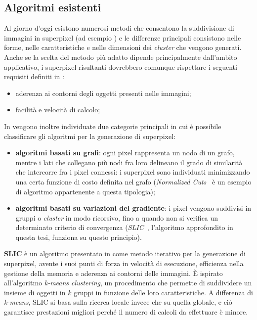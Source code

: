 \documentclass[12pt,a4paper,oneside]{article}
\begin{document}
\subsection{Algoritmi esistenti}
Al giorno d'oggi esistono numerosi metodi che consentono la suddivisione di immagini in superpixel (ad esempio \cite{ACHANTA_SLIC,GENERATIVE_PIETRO,COMANICIU_MEAN_SHIFT,MALIK_NORMALIZED_CUTS,FELZENSZWALB_GRAPH,GRID_SEAMS}) e le differenze principali consistono nelle forme, nelle caratteristiche e nelle dimensioni dei \textit{cluster} che vengono generati. Anche se la scelta del metodo più adatto dipende principalmente dall'ambito applicativo, i superpixel risultanti dovrebbero comunque rispettare i seguenti requisiti definiti in \cite{ACHANTA_SLIC}:
\begin{itemize}
	\item aderenza ai contorni degli oggetti presenti nelle immagini;
	\item facilità e velocità di calcolo;
\end{itemize}
In \cite{ACHANTA_SLIC} vengono inoltre individuate due categorie principali in cui è possibile classificare gli algoritmi per la generazione di superpixel:
\begin{itemize}
	\item\textbf{algoritmi basati su grafi}: ogni pixel rappresenta un nodo di un grafo, mentre i lati che collegano più nodi fra loro delineano il grado di similarità che intercorre fra i pixel connessi: i superpixel sono individuati minimizzando una certa funzione di costo definita nel grafo (\textit{Normalized Cuts}~\cite{MALIK_NORMALIZED_CUTS} è un esempio di algoritmo appartenente a questa tipologia);
	\item\textbf{algoritmi basati su variazioni del gradiente}: i pixel vengono suddivisi in gruppi o \textit{cluster} in modo ricorsivo, fino a quando non si verifica un determinato criterio di convergenza (\textit{\acrshort{SLIC}}~\cite{ACHANTA_SLIC}, l'algoritmo approfondito in questa tesi, funziona su questo principio).
\end{itemize}

\noindent\textbf{\Gls{SLIC}} è un algoritmo presentato in \cite{ACHANTA_SLIC} come metodo iterativo per la generazione di superpixel, avente i suoi punti di forza in velocità di esecuzione, efficienza nella gestione della memoria e aderenza ai contorni delle immagini. È ispirato all'algoritmo \textit{k-means clustering}, un procedimento che permette di suddividere un insieme di oggetti in $k$ gruppi in funzione delle loro caratteristiche. A differenza di \textit{k-means}, \gls{SLIC} si basa sulla ricerca locale invece che su quella globale, e ciò garantisce prestazioni migliori perché il numero di calcoli da effettuare è minore.
\end{document}
